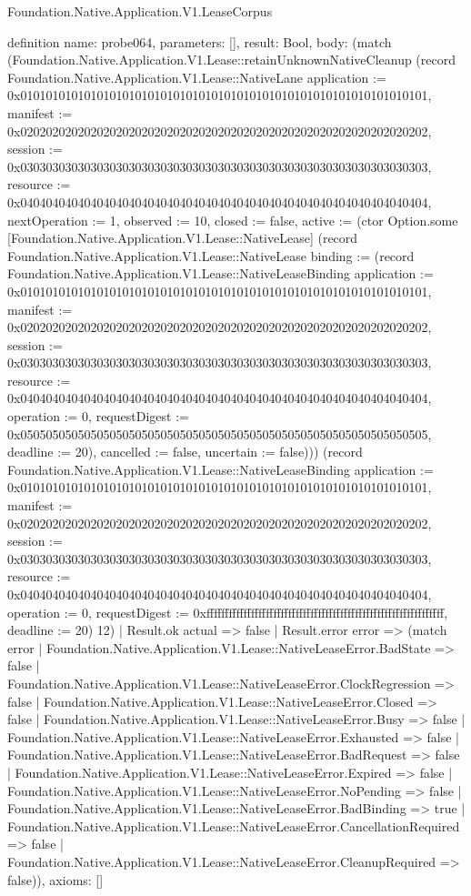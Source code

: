 \begin{lexlean}{Foundation.Native.Application.V1.LeaseCorpus}
\begin{semanticmodule}
definition{
  name: probe064,
  parameters: [],
  result: Bool,
  body: (match (Foundation.Native.Application.V1.Lease::retainUnknownNativeCleanup (record Foundation.Native.Application.V1.Lease::NativeLane {application := 0x0101010101010101010101010101010101010101010101010101010101010101, manifest := 0x0202020202020202020202020202020202020202020202020202020202020202, session := 0x0303030303030303030303030303030303030303030303030303030303030303, resource := 0x0404040404040404040404040404040404040404040404040404040404040404, nextOperation := 1, observed := 10, closed := false, active := (ctor Option.some [Foundation.Native.Application.V1.Lease::NativeLease] (record Foundation.Native.Application.V1.Lease::NativeLease {binding := (record Foundation.Native.Application.V1.Lease::NativeLeaseBinding {application := 0x0101010101010101010101010101010101010101010101010101010101010101, manifest := 0x0202020202020202020202020202020202020202020202020202020202020202, session := 0x0303030303030303030303030303030303030303030303030303030303030303, resource := 0x0404040404040404040404040404040404040404040404040404040404040404, operation := 0, requestDigest := 0x0505050505050505050505050505050505050505050505050505050505050505, deadline := 20}), cancelled := false, uncertain := false}))}) (record Foundation.Native.Application.V1.Lease::NativeLeaseBinding {application := 0x0101010101010101010101010101010101010101010101010101010101010101, manifest := 0x0202020202020202020202020202020202020202020202020202020202020202, session := 0x0303030303030303030303030303030303030303030303030303030303030303, resource := 0x0404040404040404040404040404040404040404040404040404040404040404, operation := 0, requestDigest := 0xffffffffffffffffffffffffffffffffffffffffffffffffffffffffffffffff, deadline := 20}) 12)
    | Result.ok actual => false
    | Result.error error => (match error
      | Foundation.Native.Application.V1.Lease::NativeLeaseError.BadState => false
      | Foundation.Native.Application.V1.Lease::NativeLeaseError.ClockRegression => false
      | Foundation.Native.Application.V1.Lease::NativeLeaseError.Closed => false
      | Foundation.Native.Application.V1.Lease::NativeLeaseError.Busy => false
      | Foundation.Native.Application.V1.Lease::NativeLeaseError.Exhausted => false
      | Foundation.Native.Application.V1.Lease::NativeLeaseError.BadRequest => false
      | Foundation.Native.Application.V1.Lease::NativeLeaseError.Expired => false
      | Foundation.Native.Application.V1.Lease::NativeLeaseError.NoPending => false
      | Foundation.Native.Application.V1.Lease::NativeLeaseError.BadBinding => true
      | Foundation.Native.Application.V1.Lease::NativeLeaseError.CancellationRequired => false
      | Foundation.Native.Application.V1.Lease::NativeLeaseError.CleanupRequired => false)),
  axioms: []
}


\end{semanticmodule}
\end{lexlean}
